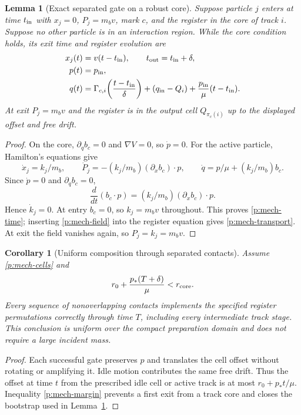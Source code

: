 \documentclass[11pt,oneside,openany]{book}
\newtheorem{lemma}[theorem]{Lemma}
\newtheorem{corollary}[theorem]{Corollary}
\theoremstyle{definition}
\theoremstyle{remark}\newtheorem{remark}[theorem]{Remark}
\begin{document}
\begin{lemma}[Exact separated gate on a robust core]
\label{p:mech-exactgate}
Suppose particle $j$ enters at time $t_{\rm in}$ with $x_j=0$,
$P_j=m_bv$, mark $c$, and the register in the core of track $i$.
Suppose no other particle is in an interaction region.
While the core condition holds, its exit time and register evolution are
\begin{align}
 x_j(t)&=v(t-t_{\rm in}),\qquad
 t_{\rm out}=t_{\rm in}+\delta,\label{p:mech-time}\\
 p(t)&=p_{\rm in},\nonumber\\
 q(t)&=\Gamma_{c,i}\!\left(\frac{t-t_{\rm in}}{\delta}\right)
       +(q_{\rm in}-Q_i)
       +\frac{p_{\rm in}}{\mu}(t-t_{\rm in}).\label{p:mech-transport}
\end{align}
At exit $P_j=m_bv$ and the register is in the output cell
$Q_{\pi_c(i)}$ up to the displayed offset and free drift.
\end{lemma}
\begin{proof}
On the core, $\partial_qb_c=0$ and $\nabla V=0$, so $\dot p=0$.
For the active particle, Hamilton's equations give
\[
 \dot x_j=k_j/m_b,\qquad
 \dot P_j=-(k_j/m_b)(\partial_xb_c)\cdot p,\qquad
 \dot q=p/\mu+(k_j/m_b)b_c.
\]
Since $\dot p=0$ and $\partial_qb_c=0$,
\[
 \frac{d}{dt}(b_c\cdot p)
       =(k_j/m_b)(\partial_xb_c)\cdot p.
\]
Hence $\dot k_j=0$. At entry $b_c=0$, so $k_j=m_bv$ throughout.
This proves \eqref{p:mech-time}; inserting \eqref{p:mech-field} into the
register equation gives \eqref{p:mech-transport}.
At exit the field vanishes again, so $P_j=k_j=m_bv$.
\end{proof}

\begin{corollary}[Uniform composition through separated contacts]
\label{p:mech-robust}
Assume \eqref{p:mech-cells} and
\begin{equation}\label{p:mech-margin}
 r_0+\frac{p_*(T+\delta)}{\mu}<r_{\rm core}.
\end{equation}
Every sequence of nonoverlapping contacts implements the specified register
permutations correctly through time $T$, including every intermediate track
stage. This conclusion is uniform over the compact preparation domain and
does not require a large incident mass.
\end{corollary}
\begin{proof}
Each successful gate preserves $p$ and translates the cell offset without
rotating or amplifying it. Idle motion contributes the same free drift.
Thus the offset at time $t$ from the prescribed idle cell or active track
is at most $r_0+p_*t/\mu$. Inequality \eqref{p:mech-margin} prevents a first
exit from a track core and closes the bootstrap used in
Lemma~\ref{p:mech-exactgate}.
\end{proof}
\end{document}
